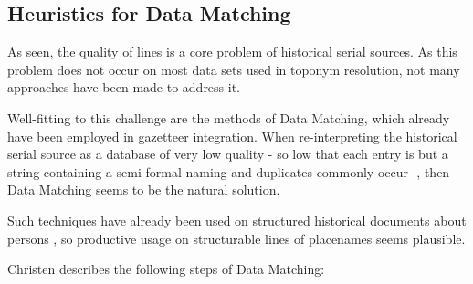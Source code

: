 \documentclass[11pt]{article}
\begin{document}
\subsection{Heuristics for Data Matching}
As seen, the quality of lines is a core problem of historical serial sources. As this problem does not occur on most data sets used in toponym resolution, not many approaches have been made to address it.

Well-fitting to this challenge are the methods of Data Matching, which already have been employed in gazetteer integration. When re-interpreting the historical serial source as a database of very low quality - so low that each entry is but a string containing a semi-formal naming and duplicates commonly occur -, then Data Matching seems to be the natural solution.

Such techniques have already been used on structured historical documents about persons \cite[p. 21]{christen12}, so productive usage on structurable lines of placenames seems plausible.

Christen describes the following steps of Data Matching:
\end{document}
